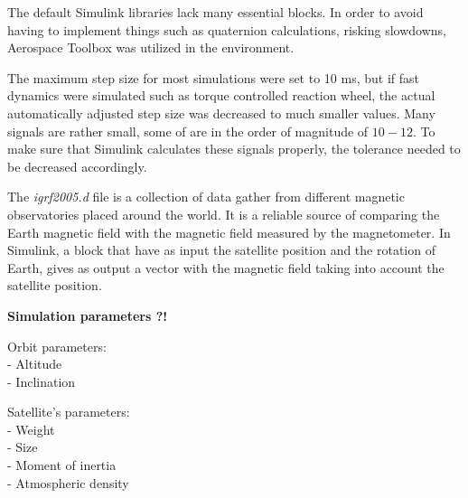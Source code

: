 The default Simulink libraries lack many essential blocks. In order to avoid having to implement things such as quaternion calculations, risking slowdowns, Aerospace Toolbox was utilized in the environment.

The maximum step size for most simulations were set to 10 ms, but if fast dynamics were simulated such as torque controlled reaction wheel, the actual automatically adjusted step size was decreased to much smaller values. Many signals are rather small, some of are in the order of magnitude of $10-{12}$. To make sure that Simulink calculates these signals properly, the tolerance needed to be decreased accordingly.


The\textit{ igrf2005.d} file is a collection of data gather from different magnetic observatories placed around the world. It is a reliable source of comparing the Earth magnetic field with the magnetic field measured by the magnetometer.
In Simulink, a block that have as input the satellite position and the rotation of Earth, gives as output a vector with the magnetic field taking into account the satellite position.

\textbf{Simulation parameters ?!} 

Orbit parameters: \\
- Altitude\\
- Inclination 

Satellite’s parameters: \\
- Weight \\
- Size \\
- Moment of inertia \\
- Atmospheric density